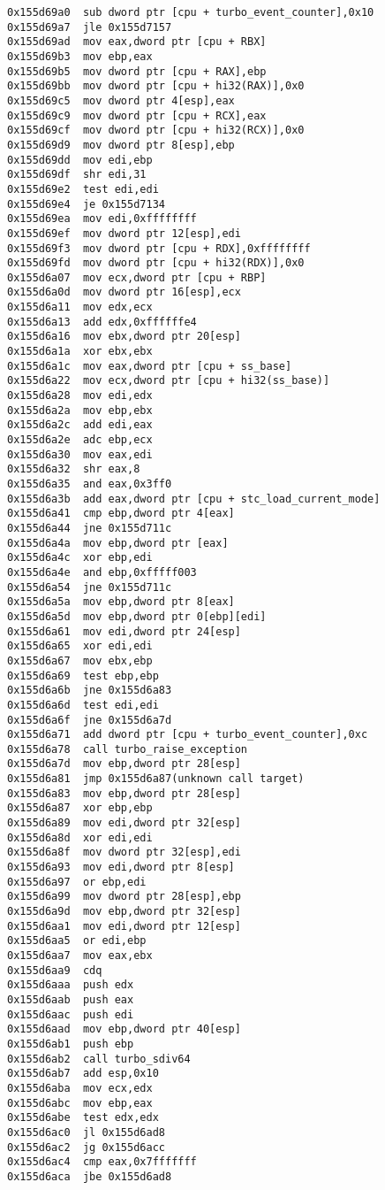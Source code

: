 \begin{lstlisting}
0x155d69a0  sub dword ptr [cpu + turbo_event_counter],0x10
0x155d69a7  jle 0x155d7157
0x155d69ad  mov eax,dword ptr [cpu + RBX]
0x155d69b3  mov ebp,eax
0x155d69b5  mov dword ptr [cpu + RAX],ebp
0x155d69bb  mov dword ptr [cpu + hi32(RAX)],0x0
0x155d69c5  mov dword ptr 4[esp],eax
0x155d69c9  mov dword ptr [cpu + RCX],eax
0x155d69cf  mov dword ptr [cpu + hi32(RCX)],0x0
0x155d69d9  mov dword ptr 8[esp],ebp
0x155d69dd  mov edi,ebp
0x155d69df  shr edi,31
0x155d69e2  test edi,edi
0x155d69e4  je 0x155d7134
0x155d69ea  mov edi,0xffffffff
0x155d69ef  mov dword ptr 12[esp],edi
0x155d69f3  mov dword ptr [cpu + RDX],0xffffffff
0x155d69fd  mov dword ptr [cpu + hi32(RDX)],0x0
0x155d6a07  mov ecx,dword ptr [cpu + RBP]
0x155d6a0d  mov dword ptr 16[esp],ecx
0x155d6a11  mov edx,ecx
0x155d6a13  add edx,0xffffffe4
0x155d6a16  mov ebx,dword ptr 20[esp]
0x155d6a1a  xor ebx,ebx
0x155d6a1c  mov eax,dword ptr [cpu + ss_base]
0x155d6a22  mov ecx,dword ptr [cpu + hi32(ss_base)]
0x155d6a28  mov edi,edx
0x155d6a2a  mov ebp,ebx
0x155d6a2c  add edi,eax
0x155d6a2e  adc ebp,ecx
0x155d6a30  mov eax,edi
0x155d6a32  shr eax,8
0x155d6a35  and eax,0x3ff0
0x155d6a3b  add eax,dword ptr [cpu + stc_load_current_mode]
0x155d6a41  cmp ebp,dword ptr 4[eax]
0x155d6a44  jne 0x155d711c
0x155d6a4a  mov ebp,dword ptr [eax]
0x155d6a4c  xor ebp,edi
0x155d6a4e  and ebp,0xfffff003
0x155d6a54  jne 0x155d711c
0x155d6a5a  mov ebp,dword ptr 8[eax]
0x155d6a5d  mov ebp,dword ptr 0[ebp][edi]
0x155d6a61  mov edi,dword ptr 24[esp]
0x155d6a65  xor edi,edi
0x155d6a67  mov ebx,ebp
0x155d6a69  test ebp,ebp
0x155d6a6b  jne 0x155d6a83
0x155d6a6d  test edi,edi
0x155d6a6f  jne 0x155d6a7d
0x155d6a71  add dword ptr [cpu + turbo_event_counter],0xc
0x155d6a78  call turbo_raise_exception
0x155d6a7d  mov ebp,dword ptr 28[esp]
0x155d6a81  jmp 0x155d6a87(unknown call target)
0x155d6a83  mov ebp,dword ptr 28[esp]
0x155d6a87  xor ebp,ebp
0x155d6a89  mov edi,dword ptr 32[esp]
0x155d6a8d  xor edi,edi
0x155d6a8f  mov dword ptr 32[esp],edi
0x155d6a93  mov edi,dword ptr 8[esp]
0x155d6a97  or ebp,edi
0x155d6a99  mov dword ptr 28[esp],ebp
0x155d6a9d  mov ebp,dword ptr 32[esp]
0x155d6aa1  mov edi,dword ptr 12[esp]
0x155d6aa5  or edi,ebp
0x155d6aa7  mov eax,ebx
0x155d6aa9  cdq
0x155d6aaa  push edx
0x155d6aab  push eax
0x155d6aac  push edi
0x155d6aad  mov ebp,dword ptr 40[esp]
0x155d6ab1  push ebp
0x155d6ab2  call turbo_sdiv64
0x155d6ab7  add esp,0x10
0x155d6aba  mov ecx,edx
0x155d6abc  mov ebp,eax
0x155d6abe  test edx,edx
0x155d6ac0  jl 0x155d6ad8
0x155d6ac2  jg 0x155d6acc
0x155d6ac4  cmp eax,0x7fffffff
0x155d6aca  jbe 0x155d6ad8


\end{lstlisting}
